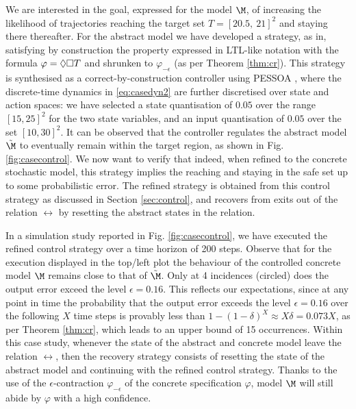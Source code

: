 \documentclass[letterpaper, 10 pt, conference]{amsart}
\theoremstyle{definition}
\theoremstyle{example}
\theoremstyle{remark}
\newcommand{\eps}{\epsilon}
\newcommand{\eventually}{\Diamond}
\begin{document}
We are interested in the goal, expressed for the model $\M$, of increasing the likelihood of trajectories reaching the target set $T = [20.5,\ 21]^2$ and staying there thereafter.
For the abstract model we have developed a strategy, as in\cite{CDC15a},  satisfying by construction the property expressed in LTL-like notation with the formula $\varphi = \eventually \always T$ and shrunken to $\varphi_{-\eps}$ (as per Theorem \ref{thm:cr}).   
This strategy is synthesised as a correct-by-construction controller using \textmd{PESSOA} \cite{Jr2010}, 
where the discrete-time dynamics in \eqref{eq:casedyn2} are further discretised over state and action spaces:  
we have selected 
a state quantisation of $0.05$ over the range $\left[15, 25\right]^2$ for the two state variables, 
and an input quantisation of $0.05$ over the set $\left[10, 30\right]^2$.   
It can be observed that the controller regulates the  abstract model $\tilde \M$ to eventually remain within the target region, as shown in Fig. \ref{fig:casecontrol}. 
We now want to verify that indeed, when refined to the concrete stochastic model, this strategy implies the reaching and staying in the safe set up to some probabilistic error. 
The refined strategy is obtained from this control strategy as discussed in Section \ref{sec:control}, 
and recovers from exits out of the relation $\rel$ by resetting the abstract states in the relation. 

In a simulation study reported in Fig. \ref{fig:casecontrol}, we have executed the refined control strategy over a time horizon of 200 steps. 
Observe that for the execution displayed in the top/left plot  
the behaviour of the controlled concrete model $\M$ remains close to that of $\tilde\M$.  
Only at 4 incidences (circled) does the output error exceed the level $\epsilon = 0.16$. 
This reflects our expectations, 
since at any point in time the probability that the output error exceeds the level $\epsilon = 0.16$ over the following $X$ time steps is provably less than $1-(1-\delta)^X \approx X \delta=0.073X$, as per Theorem \ref{thm:cr}, 
which leads to an upper bound of 15 occurrences. Within this case study, whenever the state of the abstract and concrete model leave the relation $\rel$, 
then the recovery strategy consists of resetting the state of the abstract model and continuing with the refined control strategy.  
Thanks to the use of the $\eps$-contraction $\varphi_{-\eps}$ of the concrete specification $\varphi$, 
model $\M$ will still abide by $\varphi$ with a high confidence. 
\end{document}
